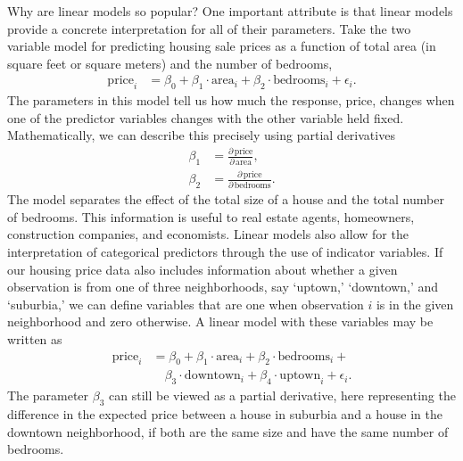 \documentclass[12pt,hidelinks]{article}
\numberwithin{equation}{section}
\begin{document}
{Why are linear models so popular? One important attribute is that
linear models provide a concrete interpretation for all of their
parameters. Take the two variable model for predicting housing sale
prices as a function of total area (in square feet or square meters)
and the number of bedrooms,
\begin{align}
\text{price}_i &= \beta_0 + \beta_1 \cdot \text{area}_i + \beta_2 \cdot \text{bedrooms}_i + \epsilon_i.
\end{align}
The parameters in this model tell us how much the response, price,
changes when one of the predictor variables changes with the other
variable held fixed. Mathematically, we can describe this precisely
using partial derivatives
\begin{align}
\beta_1 &= \frac{\partial \, \text{price}}{\partial \, \text{area}}, \\
\beta_2 &= \frac{\partial \, \text{price}}{\partial \, \text{bedrooms}}.
\end{align}
The model separates the effect of the total size of a house and the
total number of bedrooms. This information is useful to real estate
agents, homeowners, construction companies, and economists.
Linear models also allow for the interpretation of categorical predictors
through the use of indicator variables. If our housing price data also
includes information about whether a given observation is from one of
three neighborhoods, say `uptown,' `downtown,' and `suburbia,' we can
define variables that are one when observation $i$ is in the given
neighborhood and zero otherwise. A linear model with these variables
may be written as
\begin{align}
\text{price}_i &= \beta_0 + \beta_1 \cdot \text{area}_i + \beta_2 \cdot \text{bedrooms}_i + \\ \nonumber
              & \quad  \beta_3 \cdot \text{downtown}_i + \beta_4 \cdot \text{uptown}_i + \epsilon_i.
\end{align}
The parameter $\beta_3$ can still be viewed as a partial derivative, here
representing the difference in the expected price between a house in suburbia
and a house in the downtown neighborhood, if both are the same size and have
the same number of bedrooms.

}
\end{document}
